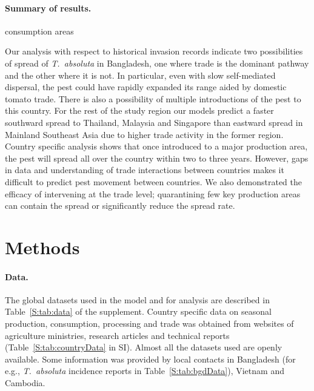\documentclass[11pt]{article}
\newcommand{\tuta}{\emph{T.~absoluta}}
\theoremstyle{definition}
\begin{document}
\paragraph{Summary of results.} 

consumption areas

Our analysis with respect to historical invasion records indicate two
possibilities of spread of \tuta{} in Bangladesh, one where trade is the
dominant pathway and the other where it is not. In particular, even with
slow self-mediated dispersal, the pest could have rapidly expanded its
range aided by domestic tomato trade.  There is also a possibility of
multiple introductions of the pest to this country. For the rest of the
study region our models predict a faster southward spread to Thailand,
Malaysia and Singapore than eastward spread in Mainland Southeast Asia due
to higher trade activity in the former region. Country specific analysis
shows that once introduced to a major production area, the pest will spread
all over the country within two to three years. However, gaps in data and
understanding of trade interactions between countries makes it difficult to
predict pest movement between countries. We also demonstrated the efficacy
of intervening at the trade level; quarantining few key production areas
can contain the spread or significantly reduce the spread rate.

\section{Methods}
\paragraph{Data.} The global datasets used in the model and for analysis are
described in Table~\ref{S:tab:data} of the supplement. Country specific data on
seasonal production, consumption, processing and trade was
obtained from websites of agriculture ministries, research articles and technical
reports (Table~\ref{S:tab:countryData} in SI). Almost
all the datasets used are openly available. Some information was
provided by local contacts in Bangladesh (for e.g., \tuta{} incidence
reports in Table~\ref{S:tab:bgdData}), Vietnam and Cambodia.
\end{document}
